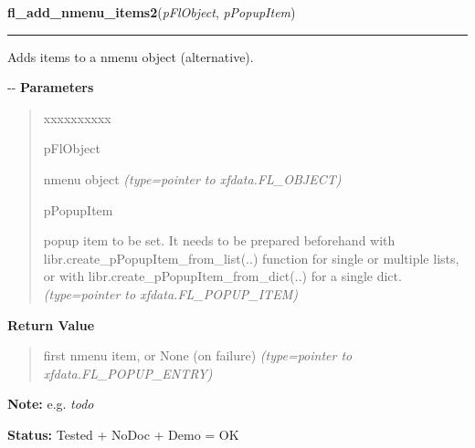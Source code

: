     \vspace{0.5ex}

\hspace{.8\funcindent}\begin{boxedminipage}{\funcwidth}

    \raggedright \textbf{fl\_add\_nmenu\_items2}(\textit{pFlObject}, \textit{pPopupItem})

    \vspace{-1.5ex}

    \rule{\textwidth}{0.5\fboxrule}
\setlength{\parskip}{2ex}

Adds items to a nmenu object (alternative).

-{}-
\setlength{\parskip}{1ex}
      \textbf{Parameters}
      \vspace{-1ex}

      \begin{quote}
        \begin{Ventry}{xxxxxxxxxx}

          \item[pFlObject]


nmenu object
            {\it (type=pointer to xfdata.FL\_OBJECT)}

          \item[pPopupItem]


popup item to be set. It needs to be prepared beforehand with
libr.create\_pPopupItem\_from\_list(..) function for single or multiple
lists, or with libr.create\_pPopupItem\_from\_dict(..) for a single dict.
            {\it (type=pointer to xfdata.FL\_POPUP\_ITEM)}

        \end{Ventry}

      \end{quote}

      \textbf{Return Value}
    \vspace{-1ex}

      \begin{quote}

first nmenu item, or None (on failure)
      {\it (type=pointer to xfdata.FL\_POPUP\_ENTRY)}

      \end{quote}

\textbf{Note:} 
e.g. \emph{todo}


\textbf{Status:} 
Tested + NoDoc + Demo = OK


    \end{boxedminipage}

    \label{xformslib:flnmenu:fl_insert_nmenu_items2}

